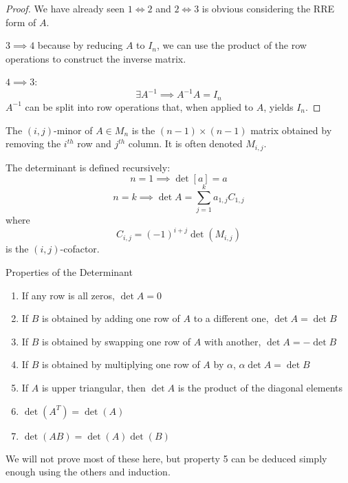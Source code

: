 \documentclass[a4paper,10pt]{article}
\begin{document}
\begin{proof}
	We have already seen $1 \iff 2$ and $2 \iff 3$ is obvious
	considering the RRE form of $A$.

	$3 \implies 4$ because by reducing $A$ to $I_n$, we can use the
	product of the row operations to construct the inverse matrix.

	$4 \implies 3$:
	\[ \exists A^{-1} \implies A^{-1}A = I_n \]
	$A^{-1}$ can be split into row operations that, when applied to
	$A$, yields $I_n$.
\end{proof}

\begin{defn}
	The $(i,j)$-minor of $A \in M_n$ is the $(n-1)\times(n-1)$
	matrix obtained by removing the $i^{th}$ row and $j^{th}$
	column. It is often denoted $M_{i,j}$.
\end{defn}

\begin{defn}[Determinant]
	The determinant is defined recursively:
	\[ n=1 \implies \det [a] = a \]
	\[ n=k \implies \det A = \sum_{j=1}^k a_{1,j} C_{1,j} \]
	where
	\[ C_{i,j} = {(-1)}^{i+j} \det(M_{i,j}) \]
	is the $(i,j)$-cofactor.
\end{defn}

Properties of the Determinant

\begin{enumerate}
	\item
		If any row is all zeros, $\det A = 0$
	\item
		If $B$ is obtained by adding one row of $A$ to a
		different one, $\det A = \det B$
	\item
		If $B$ is obtained by swapping one row of $A$ with
		another, $\det A = -\det B$
	\item
		If $B$ is obtained by multiplying one row of $A$ by
		$\alpha$, $\alpha \det A = \det B$
	\item
		If $A$ is upper triangular, then $\det A$ is the product
		of the diagonal elements
	\item
		$\det(A^T) = \det(A)$
	\item
		$\det(AB) = \det(A) \det(B)$
\end{enumerate}

We will not prove most of these here, but property 5 can be deduced
simply enough using the others and induction.
\end{document}
